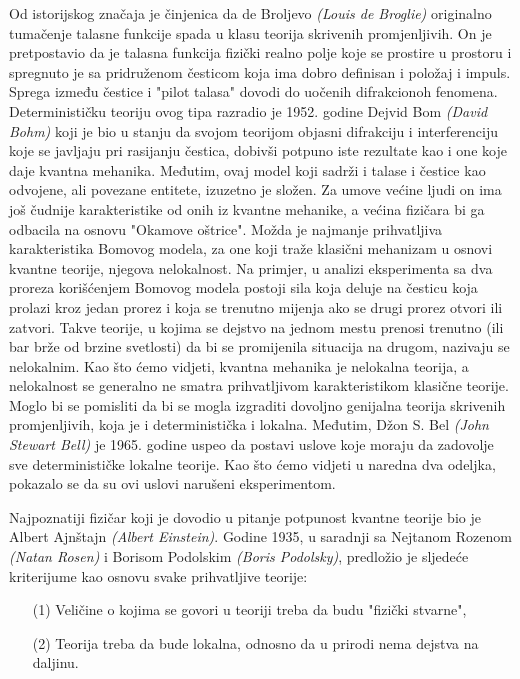 Od istorijskog značaja je činjenica da de Broljevo {\it{(Louis de Broglie)}} originalno
tumačenje talasne funkcije spada u klasu teorija skrivenih promjenljivih. On je
pretpostavio da je talasna funkcija fizički realno polje koje se prostire u prostoru
i spregnuto je sa pridruženom česticom koja ima dobro definisan i položaj i impuls.
Sprega između čestice i "pilot talasa" dovodi do uočenih difrakcionoh fenomena.
Determinističku teoriju ovog tipa razradio je 1952. godine Dejvid Bom {\it{(David Bohm)}}
koji je bio u stanju da svojom teorijom objasni difrakciju i interferenciju koje se
javljaju pri rasijanju čestica, dobivši potpuno iste rezultate kao i one koje daje
kvantna mehanika. Međutim, ovaj model koji sadrži i talase i čestice kao odvojene,
ali povezane entitete, izuzetno je složen. Za umove većine ljudi on ima još čudnije
karakteristike od onih iz kvantne mehanike, a većina fizičara bi ga odbacila na
osnovu "Okamove oštrice". Možda je najmanje prihvatljiva karakteristika Bomovog
modela, za one koji traže klasični mehanizam u osnovi kvantne teorije, njegova
nelokalnost. Na primjer, u analizi eksperimenta sa dva proreza korišćenjem Bomovog
modela postoji sila koja deluje na česticu koja prolazi kroz jedan prorez i koja se
trenutno mijenja ako se drugi prorez otvori ili zatvori. Takve teorije, u kojima se dejstvo na jednom mestu prenosi trenutno (ili bar brže od brzine svetlosti) da bi se
promijenila situacija na drugom, nazivaju se nelokalnim. Kao što ćemo vidjeti, kvantna
mehanika je nelokalna teorija, a nelokalnost se generalno ne smatra prihvatljivom
karakteristikom klasične teorije. Moglo bi se pomisliti da bi se mogla izgraditi
dovoljno genijalna teorija skrivenih promjenljivih, koja je i deterministička i
lokalna. Međutim, Džon S. Bel {\it{(John Stewart Bell)}} je 1965. godine uspeo da postavi
uslove koje moraju da zadovolje sve determinističke lokalne teorije. Kao što ćemo
vidjeti u naredna dva odeljka, pokazalo se da su ovi uslovi narušeni eksperimentom.

Najpoznatiji fizičar koji je dovodio u pitanje potpunost kvantne teorije bio je
Albert Ajnštajn {\it{(Albert Einstein)}}. Godine 1935, u saradnji sa Nejtanom Rozenom
{\it{(Natan Rosen)}} i Borisom Podolskim {\it{(Boris Podolsky)}}, predložio je sljedeće kriterijume
kao osnovu svake prihvatljive teorije:

\begin{enumerate}
    \item[(1)] Veličine o kojima se govori u teoriji treba da budu "fizički stvarne",
    \item[(2)] Teorija treba da bude lokalna, odnosno da u prirodi nema dejstva na daljinu.
\end{enumerate}

